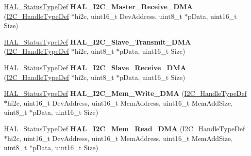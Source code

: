 \begin{DoxyCompactItemize}
\item 
\hyperlink{stm32f4xx__hal__def_8h_a63c0679d1cb8b8c684fbb0632743478f}{H\+A\+L\+\_\+\+Status\+Type\+Def} {\bfseries H\+A\+L\+\_\+\+I2\+C\+\_\+\+Master\+\_\+\+Receive\+\_\+\+D\+MA} (\hyperlink{struct_i2_c___handle_type_def}{I2\+C\+\_\+\+Handle\+Type\+Def} $\ast$hi2c, uint16\+\_\+t Dev\+Address, uint8\+\_\+t $\ast$p\+Data, uint16\+\_\+t Size)\hypertarget{group___i2_c___exported___functions___group2_ga299f5e16a92826b9856c60265bc22cf2}{}\label{group___i2_c___exported___functions___group2_ga299f5e16a92826b9856c60265bc22cf2}

\item 
\hyperlink{stm32f4xx__hal__def_8h_a63c0679d1cb8b8c684fbb0632743478f}{H\+A\+L\+\_\+\+Status\+Type\+Def} {\bfseries H\+A\+L\+\_\+\+I2\+C\+\_\+\+Slave\+\_\+\+Transmit\+\_\+\+D\+MA} (\hyperlink{struct_i2_c___handle_type_def}{I2\+C\+\_\+\+Handle\+Type\+Def} $\ast$hi2c, uint8\+\_\+t $\ast$p\+Data, uint16\+\_\+t Size)\hypertarget{group___i2_c___exported___functions___group2_ga59e69e0da57150f980deea0d235f0397}{}\label{group___i2_c___exported___functions___group2_ga59e69e0da57150f980deea0d235f0397}

\item 
\hyperlink{stm32f4xx__hal__def_8h_a63c0679d1cb8b8c684fbb0632743478f}{H\+A\+L\+\_\+\+Status\+Type\+Def} {\bfseries H\+A\+L\+\_\+\+I2\+C\+\_\+\+Slave\+\_\+\+Receive\+\_\+\+D\+MA} (\hyperlink{struct_i2_c___handle_type_def}{I2\+C\+\_\+\+Handle\+Type\+Def} $\ast$hi2c, uint8\+\_\+t $\ast$p\+Data, uint16\+\_\+t Size)\hypertarget{group___i2_c___exported___functions___group2_gad9dd42a10e5c108e30e6546cb64639c2}{}\label{group___i2_c___exported___functions___group2_gad9dd42a10e5c108e30e6546cb64639c2}

\item 
\hyperlink{stm32f4xx__hal__def_8h_a63c0679d1cb8b8c684fbb0632743478f}{H\+A\+L\+\_\+\+Status\+Type\+Def} {\bfseries H\+A\+L\+\_\+\+I2\+C\+\_\+\+Mem\+\_\+\+Write\+\_\+\+D\+MA} (\hyperlink{struct_i2_c___handle_type_def}{I2\+C\+\_\+\+Handle\+Type\+Def} $\ast$hi2c, uint16\+\_\+t Dev\+Address, uint16\+\_\+t Mem\+Address, uint16\+\_\+t Mem\+Add\+Size, uint8\+\_\+t $\ast$p\+Data, uint16\+\_\+t Size)\hypertarget{group___i2_c___exported___functions___group2_ga12a2a86be393359534f630cdd090d8bb}{}\label{group___i2_c___exported___functions___group2_ga12a2a86be393359534f630cdd090d8bb}

\item 
\hyperlink{stm32f4xx__hal__def_8h_a63c0679d1cb8b8c684fbb0632743478f}{H\+A\+L\+\_\+\+Status\+Type\+Def} {\bfseries H\+A\+L\+\_\+\+I2\+C\+\_\+\+Mem\+\_\+\+Read\+\_\+\+D\+MA} (\hyperlink{struct_i2_c___handle_type_def}{I2\+C\+\_\+\+Handle\+Type\+Def} $\ast$hi2c, uint16\+\_\+t Dev\+Address, uint16\+\_\+t Mem\+Address, uint16\+\_\+t Mem\+Add\+Size, uint8\+\_\+t $\ast$p\+Data, uint16\+\_\+t Size)\hypertarget{group___i2_c___exported___functions___group2_gab25b99552182d2486d8eb441fffdd0a4}{}\label{group___i2_c___exported___functions___group2_gab25b99552182d2486d8eb441fffdd0a4}


\end{DoxyCompactItemize}

